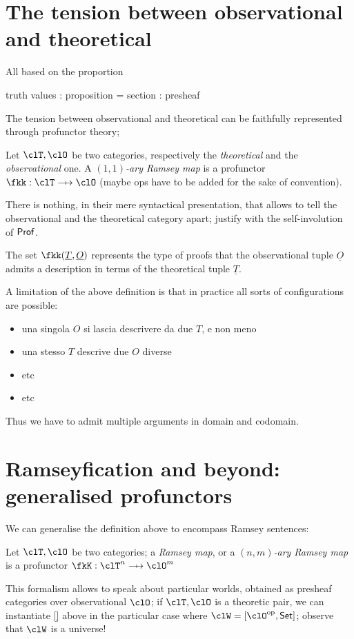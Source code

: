 \documentclass[a4paper]{../birkjour}
\begin{document}
\section{The tension between observational and theoretical}
\label{sec:orge11c3c4}
All based on the proportion

truth values : proposition = section : presheaf

The tension between observational and theoretical can be faithfully represented through profunctor theory;
\begin{definition}
  Let $\clT,\clO$ be two categories, respectively the \emph{theoretical} and the \emph{observational} one. A \emph{$(1,1)$-ary Ramsey map} is a profunctor $\fkk : \clT \pto \clO$ (maybe ops have to be added for the sake of convention).
\end{definition}
There is nothing, in their mere syntactical presentation, that allows to tell the observational and the theoretical category apart; justify with the self-involution of $\mathsf{Prof}$.

The set $\fkk(\underline T, \underline O)$ represents the type of proofs that the observational tuple $\underline O$ admits a description in terms of the theoretical tuple $\underline T$.

A limitation of the above definition is that in practice all sorts of configurations are possible:
\begin{itemize}
  \item una singola $O$ si lascia descrivere da due $T$, e non meno
  \item una stesso $T$ descrive due $O$ diverse
  \item etc
  \item etc
\end{itemize}
Thus we have to admit multiple arguments in domain and codomain.
\section{Ramseyfication and beyond: generalised profunctors}
\label{sec:org50db6c2}
We can generalise the definition above to encompass Ramsey sentences:
\begin{definition}
  Let $\clT,\clO$ be two categories; a \emph{Ramsey map}, or a \emph{$(n,m)$-ary Ramsey map} is a profunctor $\fkK : \clT^n \pto \clO^m$
\end{definition}
This formalism allows to speak about particular worlds, obtained as presheaf categories over observational $\clO$; if $\clT, \clO$ is a theoretic pair, we can instantiate \autoref{} above in the particular case where $\clW = [\clO^\op, \Set]$; observe that $\clW$ is a universe!
\end{document}
